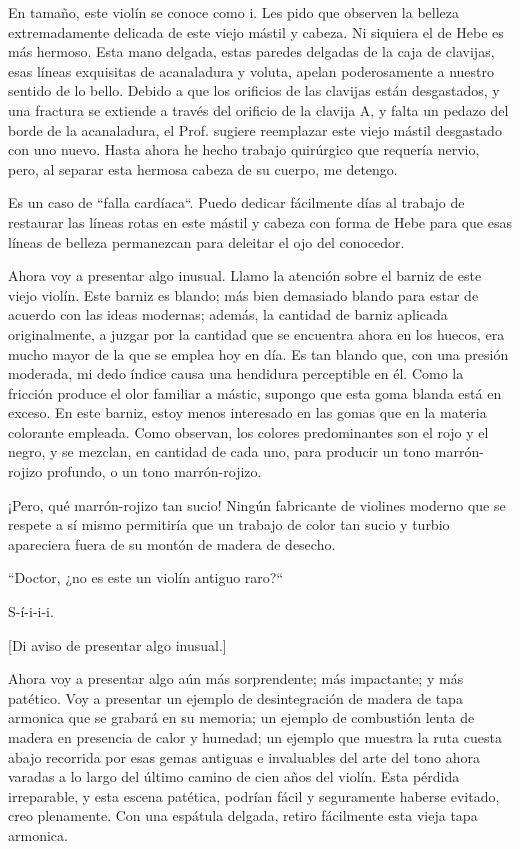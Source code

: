\documentclass[12pt]{book}
\begin{document}
En tamaño, este violín se conoce como i. Les pido que observen la belleza extremadamente delicada de este viejo mástil y cabeza. Ni siquiera el de Hebe es más hermoso. Esta mano delgada, estas paredes delgadas de la caja de clavijas, esas líneas exquisitas de acanaladura y voluta, apelan poderosamente a nuestro sentido de lo bello. Debido a que los orificios de las clavijas están desgastados, y una fractura se extiende a través del orificio de la clavija A, y falta un pedazo del borde de la acanaladura, el Prof. sugiere reemplazar este viejo mástil desgastado con uno nuevo. Hasta ahora he hecho trabajo quirúrgico que requería nervio, pero, al separar esta hermosa cabeza de su cuerpo, me detengo.

Es un caso de ``falla cardíaca``. Puedo dedicar fácilmente días al trabajo de restaurar las líneas rotas en este mástil y cabeza con forma de Hebe para que esas líneas de belleza permanezcan para deleitar el ojo del conocedor.

Ahora voy a presentar algo inusual. Llamo la atención sobre el barniz de este viejo violín. Este barniz es blando; más bien demasiado blando para estar de acuerdo con las ideas modernas; además, la cantidad de barniz aplicada originalmente, a juzgar por la cantidad que se encuentra ahora en los huecos, era mucho mayor de la que se emplea hoy en día. Es tan blando que, con una presión moderada, mi dedo índice causa una hendidura perceptible en él. Como la fricción produce el olor familiar a mástic, supongo que esta goma blanda está en exceso. En este barniz, estoy menos interesado en las gomas que en la materia colorante empleada. Como observan, los colores predominantes son el rojo y el negro, y se mezclan, en cantidad de cada uno, para producir un tono marrón-rojizo profundo, o un tono marrón-rojizo.

¡Pero, qué marrón-rojizo tan sucio! Ningún fabricante de violines moderno que se respete a sí mismo permitiría que un trabajo de color tan sucio y turbio apareciera fuera de su montón de madera de desecho.

``Doctor, ¿no es este un violín antiguo raro?``

S-í-i-i-i.

[Di aviso de presentar algo inusual.]

Ahora voy a presentar algo aún más sorprendente; más impactante; y más patético. Voy a presentar un ejemplo de desintegración de madera de tapa armonica que se grabará en su memoria; un ejemplo de combustión lenta de madera en presencia de calor y humedad; un ejemplo que muestra la ruta cuesta abajo recorrida por esas gemas antiguas e invaluables del arte del tono ahora varadas a lo largo del último camino de cien años del violín. Esta pérdida irreparable, y esta escena patética, podrían fácil y seguramente haberse evitado, creo plenamente. Con una espátula delgada, retiro fácilmente esta vieja tapa armonica.
\end{document}
